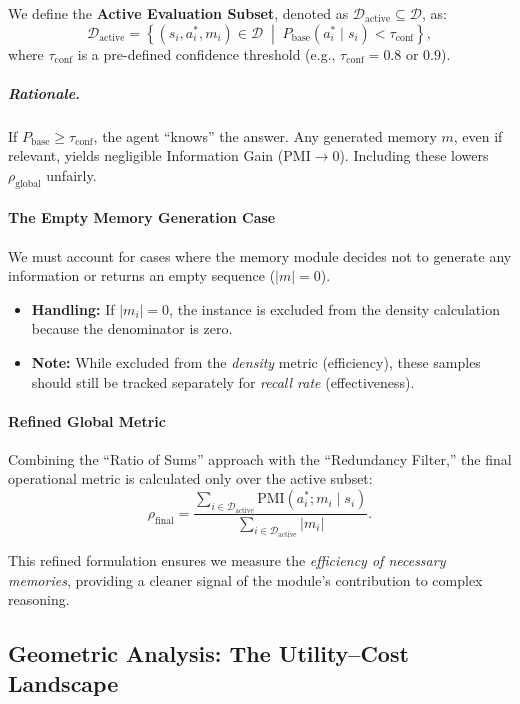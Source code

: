 We define the \textbf{Active Evaluation Subset}, denoted as $\mathcal{D}_{\text{active}} \subseteq \mathcal{D}$, as:
\[
\mathcal{D}_{\text{active}}
=
\left\{
    (s_i, a^*_i, m_i) \in \mathcal{D}
    \;\middle|\;
    P_{\text{base}}(a^*_i \mid s_i) < \tau_{\text{conf}}
\right\},
\]
where $\tau_{\text{conf}}$ is a pre-defined confidence threshold (e.g., $\tau_{\text{conf}} = 0.8$ or $0.9$).

\subparagraph{Rationale.}
If $P_{\text{base}} \ge \tau_{\text{conf}}$, the agent ``knows'' the answer.  
Any generated memory $m$, even if relevant, yields negligible Information Gain ($\mathrm{PMI} \to 0$).  
Including these lowers $\rho_{\text{global}}$ unfairly.

\paragraph{The Empty Memory Generation Case}

We must account for cases where the memory module decides not to generate any information or returns an empty sequence ($|m| = 0$).

\begin{itemize}
    \item \textbf{Handling:} If $|m_i| = 0$, the instance is excluded from the density calculation because the denominator is zero.
    \item \textbf{Note:} While excluded from the \emph{density} metric (efficiency), these samples should still be tracked separately for \emph{recall rate} (effectiveness).
\end{itemize}

\paragraph{Refined Global Metric}

Combining the ``Ratio of Sums'' approach with the ``Redundancy Filter,'' the final operational metric is calculated only over the active subset:
\[
\rho_{\text{final}}
=
\frac{
    \sum_{i \in \mathcal{D}_{\text{active}}}
        \mathrm{PMI}(a^*_i; m_i \mid s_i)
}{
    \sum_{i \in \mathcal{D}_{\text{active}}}
        |m_i|
}.
\]

This refined formulation ensures we measure the \emph{efficiency of necessary memories}, providing a cleaner signal of the module's contribution to complex reasoning.

\subsection{Geometric Analysis: The Utility--Cost Landscape}

